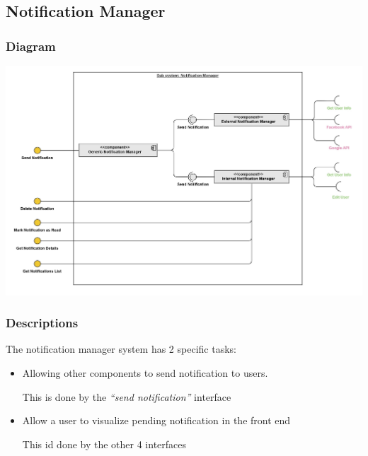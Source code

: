 \documentclass{article}
\begin{document}
\subsection{Notification Manager}
\subsubsection{Diagram}
\includegraphics[width=\textwidth,height=\textheight,keepaspectratio]{images/component_diagram/notification_manager.jpg}
\subsubsection{Descriptions}
The notification manager system has 2 specific tasks:
\begin{itemize}
    \item Allowing other components to send notification to users.

          This is done by the \textit{``send notification''} interface
    \item Allow a user to visualize pending notification in the front end

          This id done by the other 4 interfaces
\end{itemize}
\end{document}
